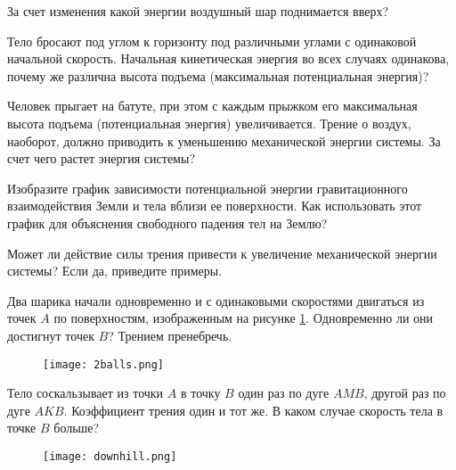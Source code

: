 \begin{ex}
За счет изменения какой энергии воздушный шар поднимается вверх?
\end{ex}

\begin{ex}
Тело бросают под углом к горизонту под различными углами с одинаковой начальной скорость. Начальная кинетическая энергия во всех случаях одинакова, почему же различна высота подъема (максимальная потенциальная энергия)?
\end{ex}

\begin{ex}
Человек прыгает на батуте, при этом с каждым прыжком его максимальная высота подъема (потенциальная энергия) увеличивается. Трение о воздух, наоборот, должно приводить к уменьшению механической энергии системы. За счет чего растет энергия системы?
\end{ex}

\begin{ex}
Изобразите график зависимости потенциальной энергии гравитационного взаимодействия Земли и тела вблизи ее поверхности. Как использовать этот график для объяснения свободного падения тел на Землю?
\end{ex}

\begin{ex}
Может ли действие силы трения привести к увеличение механической энергии системы? Если да, приведите примеры. 
\end{ex}

\begin{ex}
Два шарика начали одновременно и с одинаковыми скоростями двигаться из точек $A$ по поверхностям, изображенным на рисунке  \ref{2balls}. Одновременно ли они достигнут точек $B$? Трением пренебречь.

\begin{figure}[h]
\centering
\texttt{[image: 2balls.png]}
\caption{}
\label{2balls}
\end{figure}
\end{ex}

\begin{ex}
Тело соскальзывает из точки $A$ в точку $B$ один раз по дуге $AMB$, другой раз по дуге $AKB$. Коэффициент трения один и тот же. В каком случае скорость тела в точке $B$ больше? 

\begin{figure}[h]
\centering
\texttt{[image: downhill.png]}
\caption{}
\label{downhill}
\end{figure}
\end{ex}

